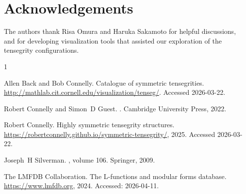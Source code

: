 \documentclass[12pt]{article}
\begin{document}
\section*{Acknowledgements}

The authors thank Risa Omura and Haruka Sakamoto for helpful discussions,
and for developing visualization tools
that assisted our exploration of the tensegrity configurations.

%
%

\begin{thebibliography}{1}

{Allen Back and Bob Connelly}.
\newblock Catalogue of symmetric tensegrities.
\newblock \url{http://mathlab.cit.cornell.edu/visualization/tenseg/}.
\newblock Accessed 2026-03-22.

Robert Connelly and Simon~D Guest.
.
\newblock Cambridge University Press, 2022.

{Robert Connelly}.
\newblock Highly symmetric tensegrity structures.
\newblock \url{https://robertconnelly.github.io/symmetric-tensegrity/}, 2025.
\newblock Accessed 2026-03-22.

Joseph~H Silverman.
, volume 106.
\newblock Springer, 2009.

{The LMFDB Collaboration}.
\newblock The {L}-functions and modular forms database.
\newblock \url{https://www.lmfdb.org}, 2024.
\newblock Accessed: 2026-04-11.

\end{thebibliography}
\end{document}
